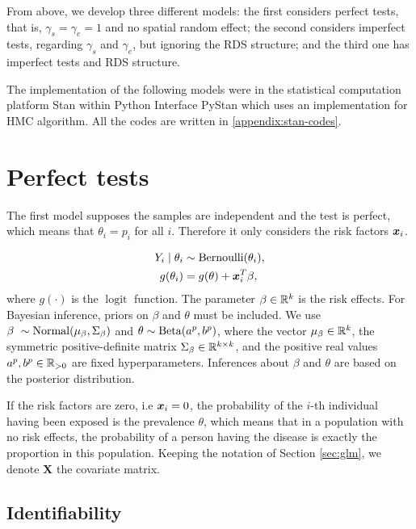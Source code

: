 From above, we develop three different models: the first considers perfect 
tests, that is, $\gamma_s = \gamma_e = 1$ and no spatial random effect; 
the second considers imperfect tests, regarding $\gamma_s$ and $\gamma_e$, 
but ignoring the RDS structure; and the third one has imperfect tests and 
RDS structure. 

The implementation of the following models were in the statistical computation
platform Stan \cite{carpenter2017stan} within Python Interface PyStan
\cite{pystan} which uses an implementation for HMC algorithm. All the codes
are written in \autoref{appendix:stan-codes}.

\section{Perfect tests}

The first model supposes the samples are independent and the test is perfect,
which means that $\theta_i = p_i$ for all $i$. Therefore it only considers the risk factors $\boldsymbol{x}_i$. 

\begin{equation}
  \begin{aligned}
    Y_i \mid \theta_i &\sim \operatorname{Bernoulli}(\theta_i), \\
    g(\theta_i) &= g(\theta) + \boldsymbol{x}_i^T\beta, 
  \end{aligned}  
\end{equation}
where $g(\cdot)$ is the $\operatorname{logit}$ function.
The parameter $\beta \in \mathbb{R}^{k}$ is the risk effects. For Bayesian inference, priors on
$\beta$ and $\theta$ must be included. We use $\beta ~ \sim \operatorname{Normal}(\mu_{\beta}, \Sigma_{\beta})$
and $\theta \sim \operatorname{Beta}(a^{p}, b^p)$, where the vector $\mu_{\beta}
\in \mathbb{R}^{k}$, the symmetric positive-definite matrix $\Sigma_{\beta} \in
\mathbb{R}^{k\times k}$, and the positive real values $a^p, b^p \in \mathbb{R}_{>0}$ are fixed
hyperparameters. Inferences about $\beta$ and $\theta$ are based on the posterior distribution.

If the risk factors are zero, i.e $\boldsymbol{x}_i = 0$, the probability of the
$i$-th individual having been exposed is the prevalence $\theta$, which means that in
a population with no risk effects, the probability of a person having the
disease is exactly the proportion in this population. Keeping the notation of
Section \ref{sec:glm}, we denote $\boldsymbol{X}$ the covariate matrix. 

\subsection{Identifiability}

